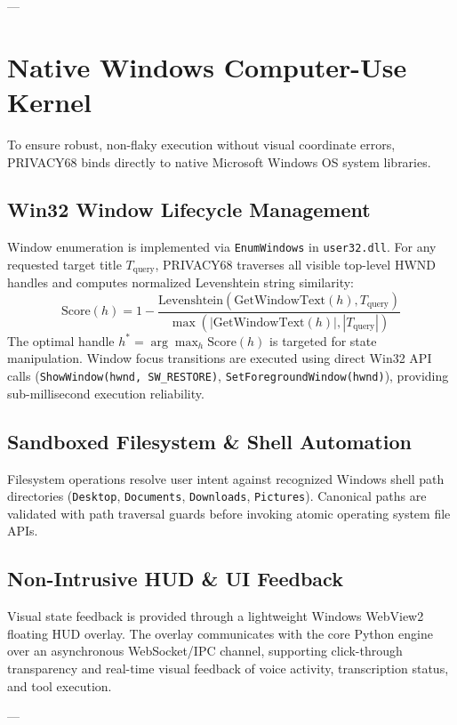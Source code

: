 \documentclass[conference]{IEEEtran}
\begin{document}
---

\section{Native Windows Computer-Use Kernel}
To ensure robust, non-flaky execution without visual coordinate errors, PRIVACY68 binds directly to native Microsoft Windows OS system libraries.

\subsection{Win32 Window Lifecycle Management}
Window enumeration is implemented via \texttt{EnumWindows} in \texttt{user32.dll}. For any requested target title $T_{\text{query}}$, PRIVACY68 traverses all visible top-level HWND handles and computes normalized Levenshtein string similarity:
\begin{equation}
\text{Score}(h) = 1 - \frac{\text{Levenshtein}(\text{GetWindowText}(h), T_{\text{query}})}{\max(|\text{GetWindowText}(h)|, |T_{\text{query}}|)}
\end{equation}
The optimal handle $h^* = \arg\max_h \text{Score}(h)$ is targeted for state manipulation. Window focus transitions are executed using direct Win32 API calls (\texttt{ShowWindow(hwnd, SW\_RESTORE)}, \texttt{SetForegroundWindow(hwnd)}), providing sub-millisecond execution reliability.

\subsection{Sandboxed Filesystem & Shell Automation}
Filesystem operations resolve user intent against recognized Windows shell path directories (\texttt{Desktop}, \texttt{Documents}, \texttt{Downloads}, \texttt{Pictures}). Canonical paths are validated with path traversal guards before invoking atomic operating system file APIs.

\subsection{Non-Intrusive HUD & UI Feedback}
Visual state feedback is provided through a lightweight Windows WebView2 floating HUD overlay. The overlay communicates with the core Python engine over an asynchronous WebSocket/IPC channel, supporting click-through transparency and real-time visual feedback of voice activity, transcription status, and tool execution.

---
\end{document}

